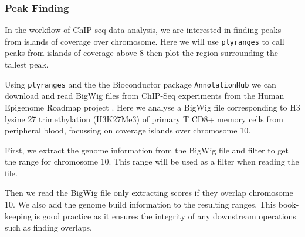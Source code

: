 \documentclass[]{article}
\newenvironment{Shaded}{\begin{snugshade}}{\end{snugshade}}
\newcommand{\DataTypeTok}[1]{\textcolor[rgb]{0.13,0.29,0.53}{#1}}
\newcommand{\KeywordTok}[1]{\textcolor[rgb]{0.13,0.29,0.53}{\textbf{#1}}}
\newcommand{\NormalTok}[1]{#1}
\newcommand{\OperatorTok}[1]{\textcolor[rgb]{0.81,0.36,0.00}{\textbf{#1}}}
\newcommand{\StringTok}[1]{\textcolor[rgb]{0.31,0.60,0.02}{#1}}
\begin{document}
\hypertarget{peak-finding}{%
\subsubsection{Peak Finding}\label{peak-finding}}

In the workflow of ChIP-seq data analysis, we are interested in finding
peaks from islands of coverage over chromosome. Here we will use
\texttt{plyranges} to call peaks from islands of coverage above 8 then
plot the region surrounding the tallest peak.

Using \texttt{plyranges} and the the Bioconductor package
\texttt{AnnotationHub} \cite{R-ahub} we can download and read BigWig
files from ChIP-Seq experiments from the Human Epigenome Roadmap project
\cite{Roadmap-Epigenomics-Consortium2015-pr}. Here we analyse a BigWig
file corresponding to H3 lysine 27 trimethylation (H3K27Me3) of primary
T CD8+ memory cells from peripheral blood, focussing on coverage islands
over chromosome 10.

First, we extract the genome information from the BigWig file and filter
to get the range for chromosome 10. This range will be used as a filter
when reading the file.

\begin{Shaded}
\end{Shaded}

Then we read the BigWig file only extracting scores if they overlap
chromosome 10. We also add the genome build information to the resulting
ranges. This book-keeping is good practice as it ensures the integrity
of any downstream operations such as finding overlaps.

\begin{Shaded}
\end{Shaded}
\end{document}

